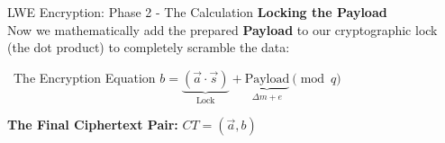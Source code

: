 \documentclass[aspectratio=169, 10pt]{beamer}
\begin{document}
\begin{frame}{LWE Encryption: Phase 2 - The Calculation}
    \Large \textbf{Locking the Payload} \\
    \vspace{0.1cm}
    \normalsize
    Now we mathematically add the prepared \textbf{Payload} to our cryptographic lock (the dot product) to completely scramble the data:
    \vspace{0.3cm}
    
    \begin{alertblock}{\faCalculator \ The Encryption Equation}
        \centering
        \vspace{0.2cm}
        \Large $b = \underbrace{(\vec{a} \cdot \vec{s})}_{\text{Lock}} + \underbrace{\text{Payload}}_{\Delta m + e} \pmod q$
        \vspace{0.2cm}
    \end{alertblock}
    \vspace{0.4cm}
    
    \begin{center}
        \large \textbf{The Final Ciphertext Pair:} \quad \Large ${CT = (\vec{a}, b)}$
    \end{center}
\end{frame}
\end{document}

